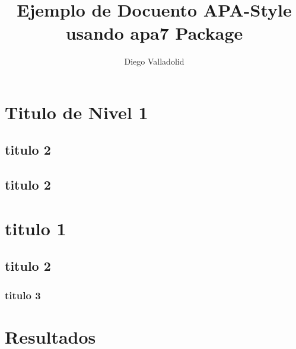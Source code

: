 \documentclass[man, floatsintext]{apa7}
\title{Ejemplo de Docuento APA-Style usando \textsf{apa7} Package}
\author{Diego Valladolid}
\affiliation{Universidad ABCD}
\begin{document}
    \maketitle


    \section{Titulo de Nivel 1}




    \subsection{titulo 2}





    \subsection{titulo 2}


    \section{titulo 1}


    \subsection{titulo 2}





    \subsubsection{titulo 3}






    \section{Resultados}
\end{document}
